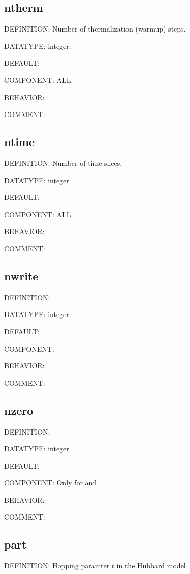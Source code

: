 \subsection{ntherm}
{\color{red}DEFINITION:} Number of thermalization (warmup) steps.

{\color{green}DATATYPE:} integer.

{\color{blue}DEFAULT:}

{\color{brown}COMPONENT:} ALL.

{\color{purple}BEHAVIOR:}

{\color{olive}COMMENT:}

\subsection{ntime}
{\color{red}DEFINITION:} Number of time slices.

{\color{green}DATATYPE:} integer.

{\color{blue}DEFAULT:}

{\color{brown}COMPONENT:} ALL.

{\color{purple}BEHAVIOR:}

{\color{olive}COMMENT:}

\subsection{nwrite}
{\color{red}DEFINITION:}

{\color{green}DATATYPE:} integer.

{\color{blue}DEFAULT:}

{\color{brown}COMPONENT:}

{\color{purple}BEHAVIOR:}

{\color{olive}COMMENT:}

\subsection{nzero}
{\color{red}DEFINITION:}

{\color{green}DATATYPE:} integer.

{\color{blue}DEFAULT:}

{\color{brown}COMPONENT:} Only for {\begonia} and {\lavender}.

{\color{purple}BEHAVIOR:}

{\color{olive}COMMENT:}

\subsection{part}
{\color{red}DEFINITION:} Hopping paramter $t$ in the Hubbard model

